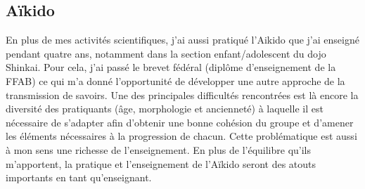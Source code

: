 \documentclass[12pt,a4paper]{article}
\begin{document}
\subsection{Aïkido}

En plus de mes activités scientifiques, j'ai aussi pratiqué l'Aikido que j'ai enseigné pendant quatre ans, notamment dans la section enfant/adolescent du dojo Shinkai.
Pour cela, j'ai passé le brevet fédéral (diplôme d'enseignement de la FFAB) ce qui m'a donné l'opportunité de développer une autre approche de la transmission de savoirs.
Une des principales difficultés rencontrées est là encore la diversité des pratiquants (âge, morphologie et ancienneté) à laquelle il est nécessaire de s'adapter afin d'obtenir une bonne cohésion du groupe et d'amener les éléments nécessaires à la progression de chacun.
Cette problématique est aussi à mon sens une richesse de l'enseignement.
En plus de l'équilibre qu'ils m'apportent, la pratique et l'enseignement de l'Aïkido seront des atouts importants en tant qu'enseignant.

%

\nocite{*}

\end{document}

